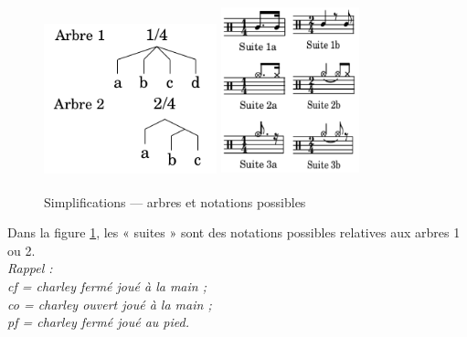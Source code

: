 \begin{figure}[h]
	\centering
	\includegraphics[height=45mm, width=50mm]{
    z_images/3_methodes/2_systemes/simplification_0.png}
	\includegraphics[height=50mm, width=40mm]{
    z_images/3_methodes/2_systemes/simplification_2.png}
	\caption{Simplifications — arbres et notations possibles}
	\label{simpl}
\end{figure}

Dans la figure \ref{simpl}, les « suites » sont des notations possibles
relatives aux arbres 1 ou 2.\\

\textit{Rappel :\\cf = charley fermé joué à la main ;\\co = charley ouvert joué
à la main ;\\ pf = charley fermé joué au pied.}\\

